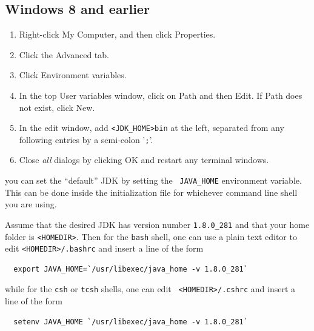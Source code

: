 \subsection*{Windows 8 and earlier}

\begin{enumerate}

\item Right-click {\sf My Computer}, and then click {\sf Properties}.

\item Click the {\sf Advanced} tab.

\item Click {\sf Environment variables}.

\item In the top {\sf User variables} window, click on {\sf Path} and 
then {\sf Edit}. If {\sf Path} does not exist, click {\sf New}.

\item In the edit window, add {\tt<JDK\_HOME>\BKS bin} at the
left, separated from any following entries by a semi-colon '{\tt ;}'.

\item Close {\it all} dialogs by clicking {\sf OK} and restart 
any terminal windows.

\end{enumerate}
\fi
\ifMacOS
you can set the ``default'' JDK by setting the {\tt
JAVA\_HOME} environment variable.  This can be done inside the
initialization file for whichever command line shell you are using.

Assume that the desired JDK has version number {\tt 1.8.0\_281} and
that your home folder is {\tt <HOMEDIR>}.  Then for the {\tt bash}
shell, one can use a plain text editor to edit {\tt <HOMEDIR>/.bashrc}
and insert a line of the form
\begin{verbatim}
  export JAVA_HOME=`/usr/libexec/java_home -v 1.8.0_281`
\end{verbatim}
while for the {\tt csh} or {\tt tcsh} shells, one can edit {\tt
<HOMEDIR>/.cshrc} and insert a line of the form
\begin{verbatim}
  setenv JAVA_HOME `/usr/libexec/java_home -v 1.8.0_281`
\end{verbatim}

